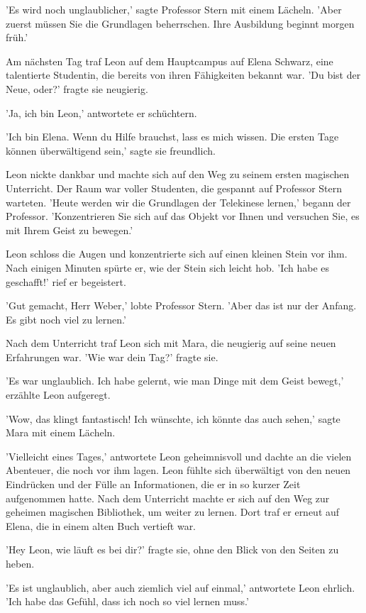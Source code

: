 \documentclass[12pt]{article}
\begin{document}
'Es wird noch unglaublicher,' sagte Professor Stern mit einem Lächeln. 'Aber zuerst müssen Sie die Grundlagen beherrschen. Ihre Ausbildung beginnt morgen früh.'

Am nächsten Tag traf Leon auf dem Hauptcampus auf Elena Schwarz, eine talentierte Studentin, die bereits von ihren Fähigkeiten bekannt war. 'Du bist der Neue, oder?' fragte sie neugierig.

'Ja, ich bin Leon,' antwortete er schüchtern.

'Ich bin Elena. Wenn du Hilfe brauchst, lass es mich wissen. Die ersten Tage können überwältigend sein,' sagte sie freundlich.

Leon nickte dankbar und machte sich auf den Weg zu seinem ersten magischen Unterricht. Der Raum war voller Studenten, die gespannt auf Professor Stern warteten. 'Heute werden wir die Grundlagen der Telekinese lernen,' begann der Professor. 'Konzentrieren Sie sich auf das Objekt vor Ihnen und versuchen Sie, es mit Ihrem Geist zu bewegen.'

Leon schloss die Augen und konzentrierte sich auf einen kleinen Stein vor ihm. Nach einigen Minuten spürte er, wie der Stein sich leicht hob. 'Ich habe es geschafft!' rief er begeistert.

'Gut gemacht, Herr Weber,' lobte Professor Stern. 'Aber das ist nur der Anfang. Es gibt noch viel zu lernen.'

Nach dem Unterricht traf Leon sich mit Mara, die neugierig auf seine neuen Erfahrungen war. 'Wie war dein Tag?' fragte sie.

'Es war unglaublich. Ich habe gelernt, wie man Dinge mit dem Geist bewegt,' erzählte Leon aufgeregt.

'Wow, das klingt fantastisch! Ich wünschte, ich könnte das auch sehen,' sagte Mara mit einem Lächeln.

'Vielleicht eines Tages,' antwortete Leon geheimnisvoll und dachte an die vielen Abenteuer, die noch vor ihm lagen. Leon fühlte sich überwältigt von den neuen Eindrücken und der Fülle an Informationen, die er in so kurzer Zeit aufgenommen hatte. Nach dem Unterricht machte er sich auf den Weg zur geheimen magischen Bibliothek, um weiter zu lernen. Dort traf er erneut auf Elena, die in einem alten Buch vertieft war.

'Hey Leon, wie läuft es bei dir?' fragte sie, ohne den Blick von den Seiten zu heben.

'Es ist unglaublich, aber auch ziemlich viel auf einmal,' antwortete Leon ehrlich. 'Ich habe das Gefühl, dass ich noch so viel lernen muss.'
\end{document}

